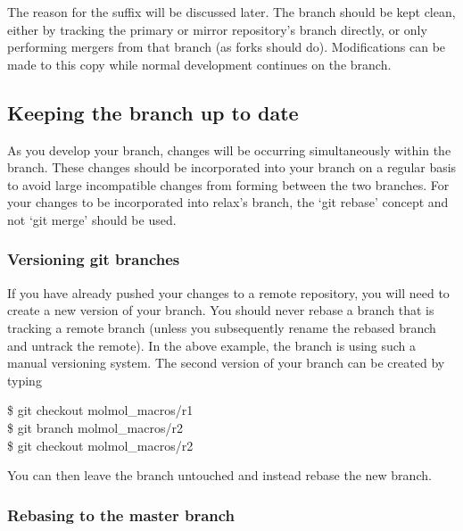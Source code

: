 The reason for the  suffix will be discussed later.
The  branch should be kept clean, either by tracking the primary or mirror repository's  branch directly, or only performing mergers from that branch (as forks should do).
Modifications can be made to this copy while normal development continues on the  branch.


\subsection{Keeping the branch up to date} \label{sect: up to date git}

As you develop your branch, changes will be occurring simultaneously within the  branch.
These changes should be incorporated into your branch on a regular basis to avoid large incompatible changes from forming between the two branches.
For your changes to be incorporated into relax's  branch, the `git rebase' concept and not `git merge' should be used.


\subsubsection{Versioning git branches} \label{sect: git branch versioning}

If you have already pushed your changes to a remote repository, you will need to create a new version of your branch.
You should never rebase a branch that is tracking a remote branch (unless you subsequently rename the rebased branch and untrack the remote).
In the above example, the  branch is using such a manual versioning system.
The second version of your branch can be created by typing

\begin{exampleenv}
\$ git checkout molmol\_macros/r1 \\
\$ git branch molmol\_macros/r2 \\
\$ git checkout molmol\_macros/r2
\end{exampleenv}

You can then leave the  branch untouched and instead rebase the new  branch.



\subsubsection{Rebasing to the master branch}

